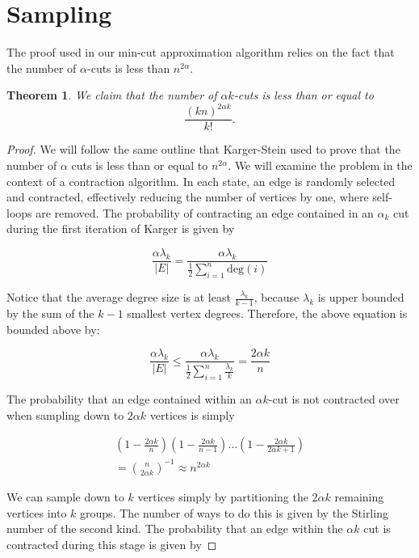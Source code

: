 \documentclass{acm_proc_article-sp}
\newtheorem{theorem}{Theorem}
\begin{document}
\section{Sampling} The proof used in our min-cut approximation algorithm relies on the fact that the number of $\alpha$-cuts is less than $n^{2 \alpha}$. 

\begin{theorem}
We claim that the number of $\alpha k$-cuts is less than or equal to
\[
\frac{(kn)^{2 \alpha k}}{k!}.
\]
\end{theorem}

\begin{proof}
We will follow the same outline that Karger-Stein used to prove that the number of $\alpha$ cuts is less than or equal to $n^{2 \alpha}$. We will examine the problem in the context of a contraction algorithm. In each state, an edge is randomly selected and contracted, effectively reducing the number of vertices by one, where self-loops are removed. The probability of contracting an edge contained in an $\alpha_k$ cut during the first iteration of Karger is given by

\[
\frac{\alpha \lambda_k}{|E|} = \frac{\alpha \lambda_k}{\frac{1}{2} \sum_{i=1}^n \text{deg}(i)}
\]

Notice that the average degree size is at least $\frac{\lambda_k}{k-1}$, because $\lambda_k$ is upper bounded by the sum of the $k-1$ smallest vertex degrees. Therefore, the above equation is bounded above by:

\[
\frac{\alpha \lambda_k}{|E|} \leq \frac{\alpha \lambda_k}{\frac{1}{2} \sum_{i=1}^n \frac{\lambda_k}{k}} = \frac{2 \alpha k}{n}
\]

The probability that an edge contained within an $\alpha k$-cut is not contracted over when sampling down to $2 \alpha k$ vertices is simply 

\begin{align*}
\left (1 - \frac{2 \alpha k}{n} \right) \left(1 - \frac{2 \alpha k}{n-1} \right) \ldots \left( 1 - \frac{2 \alpha k}{2 \alpha k + 1}\right) \\ = \binom{n}{2 \alpha k}^{-1} \approx n^{2 \alpha k}
\end{align*}

We can sample down to $k$ vertices simply by partitioning the 
$2 \alpha k$ remaining vertices into $k$ groups. The number of ways to do this is given by the Stirling number of the second kind. The probability that an edge within the $\alpha k$ cut is contracted during this stage is given by


\end{proof}
\end{document}
